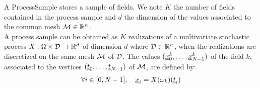 A ProcessSample stores a sample of fields. We note $K$ the number of fields contained in the process sample and $d$ the dimension of the values associated to the common mesh ${\mathcal M} \in {\mathbb R}^n$.\\

A process sample can be obtained as $K$ realizations of a multivariate stochastic process  $X: \Omega \times {\mathcal D} \rightarrow {\mathbb R}^d$   of dimension $d$ where ${\mathcal D} \in {\mathbb R}^n$, when the realizations are discretized on the same mesh ${\mathcal M}$ of ${\mathcal D}$. The  values $({\underline{x}}_0^k, \dots, {\underline{x}}_{N-1}^k)$ of the field $k$, associated to the vertices $({\underline{t}}_0, \dots, {\underline{t}}_{N-1})$ of ${\mathcal M}$, are defined by:
\begin{align}
\forall i \in [0, N-1],\quad   {\underline{x}}_i= X(\omega_k)({\underline{t}}_i)
\end{align}


